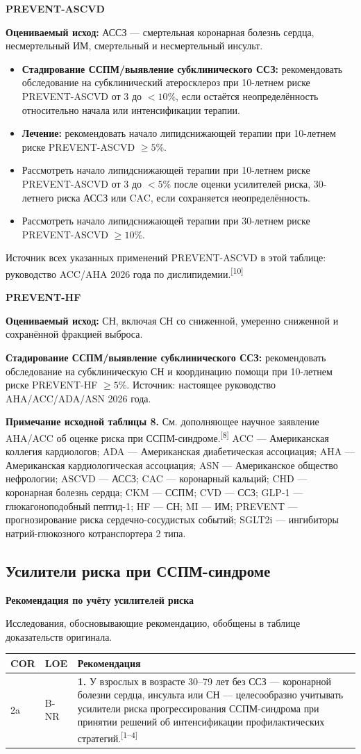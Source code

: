 \documentclass[11pt,a4paper]{article}
\newcommand{\src}[1]{\textsuperscript{[#1]}}
\newcommand{\heading}[1]{\par\medskip\textbf{#1}\par}
\begin{document}
\heading{PREVENT-ASCVD}
\textbf{Оцениваемый исход:} АССЗ --- смертельная коронарная болезнь сердца, несмертельный ИМ, смертельный и несмертельный инсульт.
\begin{itemize}
\item \textbf{Стадирование ССПМ/выявление субклинического ССЗ:} рекомендовать обследование на субклинический атеросклероз при 10-летнем риске PREVENT-ASCVD от 3 до $<10\%$, если остаётся неопределённость относительно начала или интенсификации терапии.
\item \textbf{Лечение:} рекомендовать начало липидснижающей терапии при 10-летнем риске PREVENT-ASCVD $\geq5\%$.
\item Рассмотреть начало липидснижающей терапии при 10-летнем риске PREVENT-ASCVD от 3 до $<5\%$ после оценки усилителей риска, 30-летнего риска АССЗ или CAC, если сохраняется неопределённость.
\item Рассмотреть начало липидснижающей терапии при 30-летнем риске PREVENT-ASCVD $\geq10\%$.
\end{itemize}
Источник всех указанных применений PREVENT-ASCVD в этой таблице: руководство ACC/AHA 2026 года по дислипидемии.\src{10}

\heading{PREVENT-HF}
\textbf{Оцениваемый исход:} СН, включая СН со сниженной, умеренно сниженной и сохранённой фракцией выброса.

\textbf{Стадирование ССПМ/выявление субклинического ССЗ:} рекомендовать обследование на субклиническую СН и координацию помощи при 10-летнем риске PREVENT-HF $\geq5\%$. Источник: настоящее руководство AHA/ACC/ADA/ASN 2026 года.

\textbf{Примечание исходной таблицы 8.} См. дополняющее научное заявление AHA/ACC об оценке риска при ССПМ-синдроме.\src{8} ACC --- Американская коллегия кардиологов; ADA --- Американская диабетическая ассоциация; AHA --- Американская кардиологическая ассоциация; ASN --- Американское общество нефрологии; ASCVD --- АССЗ; CAC --- коронарный кальций; CHD --- коронарная болезнь сердца; CKM --- ССПМ; CVD --- ССЗ; GLP-1 --- глюкагоноподобный пептид-1; HF --- СН; MI --- ИМ; PREVENT --- прогнозирование риска сердечно-сосудистых событий; SGLT2i --- ингибиторы натрий-глюкозного котранспортера 2 типа.

\subsection{Усилители риска при ССПМ-синдроме}
\heading{Рекомендация по учёту усилителей риска}
Исследования, обосновывающие рекомендацию, обобщены в таблице доказательств оригинала.
{\small
\begin{longtable}{P{0.07\textwidth}P{0.11\textwidth}P{0.75\textwidth}}
\toprule COR & LOE & Рекомендация\\\midrule
2a & B-NR & \textbf{1.} У взрослых в возрасте 30--79 лет без ССЗ --- коронарной болезни сердца, инсульта или СН --- целесообразно учитывать усилители риска прогрессирования ССПМ-синдрома при принятии решений об интенсификации профилактических стратегий.\src{1--4}\\
\bottomrule
\end{longtable}
}
\end{document}
